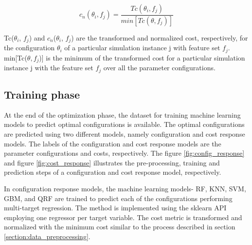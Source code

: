 \begin{equation}
    c_n(\theta_{i}, f_j) = \frac{Tc(\theta_{i}, f_j)}{min[Tc(\theta, f_j)]}
\end{equation}

Tc($\theta_{i}$, $f_j$) and $c_n$($\theta_{i}$, $f_j$) are the transformed and normalized cost, respectively, for the configuration $\theta_i$ of a particular simulation instance j with feature set $f_j$.  min[Tc($\theta, f_j$)] is the minimum of the transformed cost for a particular simulation instance j with the feature set $f_j$ over all the parameter configurations.


\subsection{Training phase}
\label{section:training_phase}
At the end of the optimization phase, the dataset for training machine learning models to predict optimal configurations is available. The optimal configurations are predicted using two different models, namely configuration and cost response models. The labels of the configuration and cost response models are the parameter configurations and costs, respectively. The figure \ref{fig:config_response} and figure \ref{fig:cost_response} illustrates the pre-processing, training and prediction steps of a configuration and cost response model, respectively.

In configuration response models, the machine learning models- RF, KNN, SVM, GBM, and QRF are trained to predict each of the configurations performing multi-target regression. The method is implemented using the sklearn API \cite{sklearn_api} employing one regressor per target variable. The cost metric is transformed and normalized with the minimum cost similar to the process described in section \ref{section:data_preprocessing}. 

